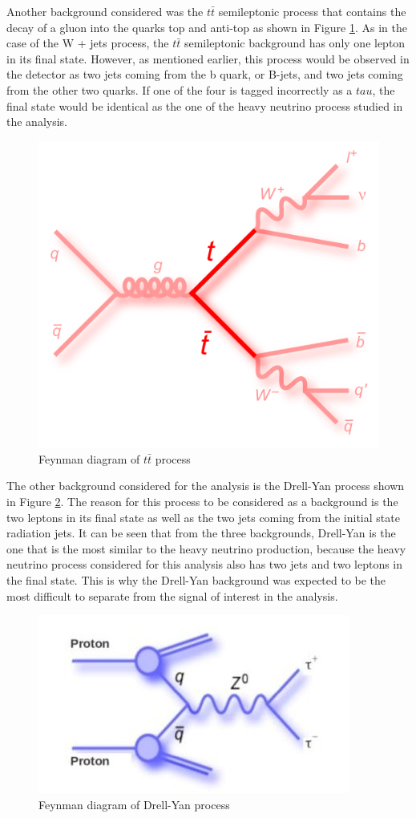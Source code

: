 Another background considered was the $t\bar{t}$ semileptonic process that contains the decay of a gluon into the quarks top and anti-top as shown in Figure \ref{fig: ttbar_background}. As in the case of the W + jets process, the $t\bar{t}$ semileptonic background has only one lepton in its final state. However, as mentioned earlier, this process would be observed in the detector as two jets coming from the b quark, or B-jets, and two jets coming from the other two quarks. If one of the four is tagged incorrectly as a $tau$, the final state would be identical as the one of the heavy neutrino process studied in the analysis.


\begin{figure}[H]
\centering
\includegraphics[width = 0.7\linewidth]{ttbar}
\caption{Feynman diagram of $t\bar{t}$ process}
\label{fig: ttbar_background}
\end{figure}

The other background considered for the analysis is the Drell-Yan process shown in Figure \ref{fig: DY_background}. The reason for this process to be considered as a background is the two leptons in its final state as well as the two jets coming from the initial state radiation jets. It can be seen that from the three backgrounds, Drell-Yan is the one that is the most similar to the heavy neutrino production, because the heavy neutrino process considered for this analysis also has two jets and two leptons in the final state. This is why the Drell-Yan background was expected to be the most difficult to separate from the signal of interest in the analysis.

\begin{figure}[H]
\centering
\includegraphics[width = 0.7\linewidth]{Drell-Yan}
\caption{Feynman diagram of Drell-Yan process}
\label{fig: DY_background}
\end{figure}